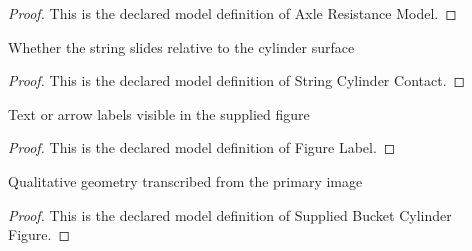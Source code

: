 \begin{proof}
  This is the declared model definition of Axle Resistance Model.
\end{proof}
\begin{definition}
  \label{def:physics:phyx-mini-0706:phyxminiproblems-problemphyxmini0706-stringcylindercontact}
  Whether the string slides relative to the cylinder surface
\end{definition}
\begin{proof}
  This is the declared model definition of String Cylinder Contact.
\end{proof}
\begin{definition}
  \label{def:physics:phyx-mini-0706:phyxminiproblems-problemphyxmini0706-figurelabel}
  Text or arrow labels visible in the supplied figure
\end{definition}
\begin{proof}
  This is the declared model definition of Figure Label.
\end{proof}
\begin{definition}
  \label{def:physics:phyx-mini-0706:phyxminiproblems-problemphyxmini0706-suppliedbucketcylinderfigure}
  Qualitative geometry transcribed from the primary image
\end{definition}
\begin{proof}
  This is the declared model definition of Supplied Bucket Cylinder Figure.
\end{proof}
